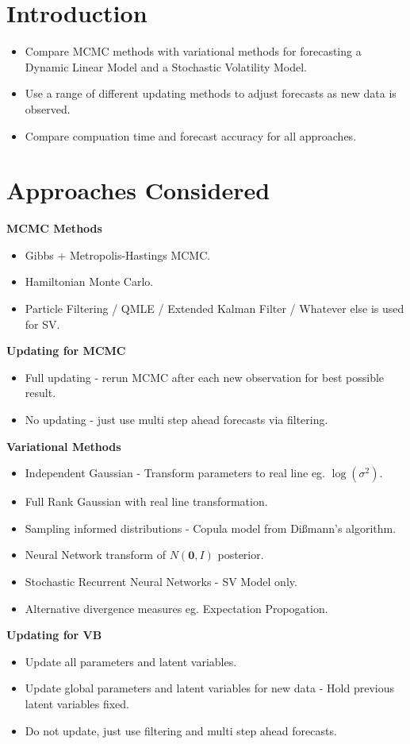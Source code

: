 \documentclass[12pt,a4paper]{article}%
\numberwithin{equation}{section}
\begin{document}
\section{Introduction}

\begin{itemize}
\item Compare MCMC methods with variational methods for forecasting a Dynamic Linear Model and a Stochastic Volatility Model. 
\item Use a range of different updating methods to adjust forecasts as new data is observed.
\item Compare compuation time and forecast accuracy for all approaches.
\end{itemize}

\section{Approaches Considered}

\textbf{MCMC Methods}
\begin{itemize}
\item Gibbs + Metropolis-Hastings MCMC.
\item Hamiltonian Monte Carlo.
\item Particle Filtering / QMLE / Extended Kalman Filter / Whatever else is used for SV.
\end{itemize}
\textbf{Updating for MCMC}
\begin{itemize}
\item Full updating - rerun MCMC after each new observation for best possible result.
\item No updating - just use multi step ahead forecasts via filtering.
\end{itemize}
\textbf{Variational Methods}
\begin{itemize}
\item Independent Gaussian - Transform parameters to real line eg. $\log(\sigma^2)$.
\item Full Rank Gaussian with real line transformation.
\item Sampling informed distributions - Copula model from Di{\ss}mann's algorithm.
\item Neural Network transform of $N(\boldsymbol{0}, I)$ posterior.
\item Stochastic Recurrent Neural Networks - SV Model only.
\item Alternative divergence measures eg. Expectation Propogation.
\end{itemize}
\textbf{Updating for VB}
\begin{itemize}
\item Update all parameters and latent variables.
\item Update global parameters and latent variables for new data - Hold previous latent variables fixed.
\item Do not update, just use filtering and multi step ahead forecasts.
\end{itemize}
\end{document}
